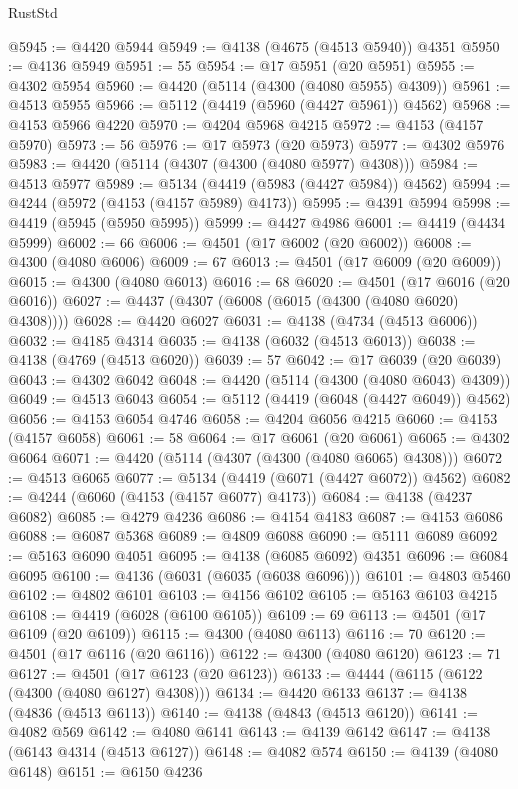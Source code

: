 \begin{lexlean}{RustStd}
\begin{coremodule}
@5945 := @4420 @5944
@5949 := @4138 (@4675 (@4513 @5940)) @4351
@5950 := @4136 @5949
@5951 := 55
@5954 := @17 @5951 (@20 @5951)
@5955 := @4302 @5954
@5960 := @4420 (@5114 (@4300 (@4080 @5955) @4309))
@5961 := @4513 @5955
@5966 := @5112 (@4419 (@5960 (@4427 @5961)) @4562)
@5968 := @4153 @5966 @4220
@5970 := @4204 @5968 @4215
@5972 := @4153 (@4157 @5970)
@5973 := 56
@5976 := @17 @5973 (@20 @5973)
@5977 := @4302 @5976
@5983 := @4420 (@5114 (@4307 (@4300 (@4080 @5977) @4308)))
@5984 := @4513 @5977
@5989 := @5134 (@4419 (@5983 (@4427 @5984)) @4562)
@5994 := @4244 (@5972 (@4153 (@4157 @5989) @4173))
@5995 := @4391 @5994
@5998 := @4419 (@5945 (@5950 @5995))
@5999 := @4427 @4986
@6001 := @4419 (@4434 @5999)
@6002 := 66
@6006 := @4501 (@17 @6002 (@20 @6002))
@6008 := @4300 (@4080 @6006)
@6009 := 67
@6013 := @4501 (@17 @6009 (@20 @6009))
@6015 := @4300 (@4080 @6013)
@6016 := 68
@6020 := @4501 (@17 @6016 (@20 @6016))
@6027 := @4437 (@4307 (@6008 (@6015 (@4300 (@4080 @6020) @4308))))
@6028 := @4420 @6027
@6031 := @4138 (@4734 (@4513 @6006))
@6032 := @4185 @4314
@6035 := @4138 (@6032 (@4513 @6013))
@6038 := @4138 (@4769 (@4513 @6020))
@6039 := 57
@6042 := @17 @6039 (@20 @6039)
@6043 := @4302 @6042
@6048 := @4420 (@5114 (@4300 (@4080 @6043) @4309))
@6049 := @4513 @6043
@6054 := @5112 (@4419 (@6048 (@4427 @6049)) @4562)
@6056 := @4153 @6054 @4746
@6058 := @4204 @6056 @4215
@6060 := @4153 (@4157 @6058)
@6061 := 58
@6064 := @17 @6061 (@20 @6061)
@6065 := @4302 @6064
@6071 := @4420 (@5114 (@4307 (@4300 (@4080 @6065) @4308)))
@6072 := @4513 @6065
@6077 := @5134 (@4419 (@6071 (@4427 @6072)) @4562)
@6082 := @4244 (@6060 (@4153 (@4157 @6077) @4173))
@6084 := @4138 (@4237 @6082)
@6085 := @4279 @4236
@6086 := @4154 @4183
@6087 := @4153 @6086
@6088 := @6087 @5368
@6089 := @4809 @6088
@6090 := @5111 @6089
@6092 := @5163 @6090 @4051
@6095 := @4138 (@6085 @6092) @4351
@6096 := @6084 @6095
@6100 := @4136 (@6031 (@6035 (@6038 @6096)))
@6101 := @4803 @5460
@6102 := @4802 @6101
@6103 := @4156 @6102
@6105 := @5163 @6103 @4215
@6108 := @4419 (@6028 (@6100 @6105))
@6109 := 69
@6113 := @4501 (@17 @6109 (@20 @6109))
@6115 := @4300 (@4080 @6113)
@6116 := 70
@6120 := @4501 (@17 @6116 (@20 @6116))
@6122 := @4300 (@4080 @6120)
@6123 := 71
@6127 := @4501 (@17 @6123 (@20 @6123))
@6133 := @4444 (@6115 (@6122 (@4300 (@4080 @6127) @4308)))
@6134 := @4420 @6133
@6137 := @4138 (@4836 (@4513 @6113))
@6140 := @4138 (@4843 (@4513 @6120))
@6141 := @4082 @569
@6142 := @4080 @6141
@6143 := @4139 @6142
@6147 := @4138 (@6143 @4314 (@4513 @6127))
@6148 := @4082 @574
@6150 := @4139 (@4080 @6148)
@6151 := @6150 @4236

\end{coremodule}
\end{lexlean}
